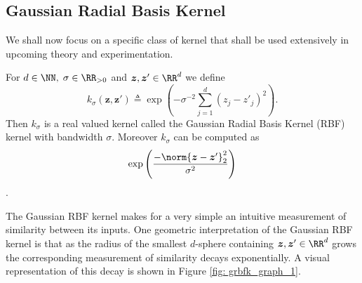 \subsection{Gaussian Radial Basis Kernel}\label{Section1.3}

We shall now focus on a specific class of kernel that shall be used extensively in upcoming theory and experimentation.

\begin{defe} \label{defe: grbfk}
    For $d \in \NN, \; \sigma \in \RR_{>0}$ and $ \bm{z} , \bm{z}' \in \RR^d$ we define
    \[
        k_\sigma \left( \bm{z} , \bm{z}' \right) \triangleq \exp \left( - \sigma^{-2} \sum_{j=1}^{d} \left( {z}_j - {{z}'}_j \right)^2 \right).
    \]
    Then $k_\sigma$ is a real valued kernel called the Gaussian Radial Basis Kernel (RBF) kernel with bandwidth $\sigma$. Moreover $k_\sigma$ can be computed as
    \[
        \exp \left( \frac{- \norm{\bm{z} - {\bm{z}'}}_{2}^{2}}{\sigma^2} \right)
    \]
    \cite{SteinwartIngo2008SVMb}.
\end{defe}
The Gaussian RBF kernel makes for a very simple an intuitive measurement of similarity between its inputs. One geometric interpretation of the Gaussian RBF kernel is that as the radius of the smallest $d$-sphere containing $\bm{z} , \bm{z}' \in \RR^d$ grows the corresponding measurement of similarity decays exponentially. A visual representation of this decay is shown in Figure \ref{fig: grbfk_graph_1}.







